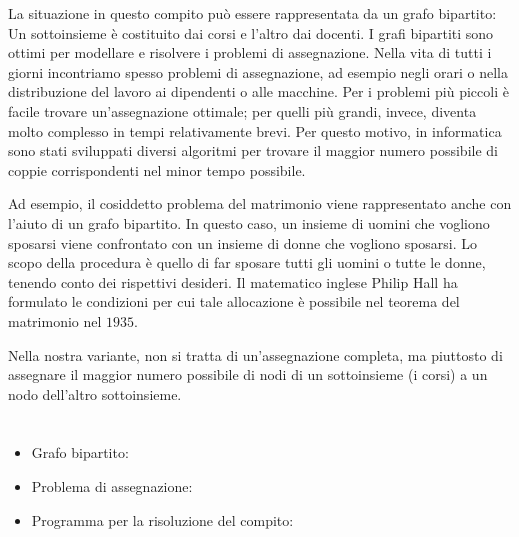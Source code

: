 {{{\centering%
\par}

La situazione in questo compito può essere rappresentata da un grafo bipartito: Un sottoinsieme è costituito dai corsi e l’altro dai docenti. I grafi bipartiti sono ottimi per modellare e risolvere i problemi di assegnazione. Nella vita di tutti i giorni incontriamo spesso problemi di assegnazione, ad esempio negli orari o nella distribuzione del lavoro ai dipendenti o alle macchine. Per i problemi più piccoli è facile trovare un’assegnazione ottimale; per quelli più grandi, invece, diventa molto complesso in tempi relativamente brevi. Per questo motivo, in informatica sono stati sviluppati diversi algoritmi per trovare il maggior numero possibile di coppie corrispondenti nel minor tempo possibile.

Ad esempio, il cosiddetto problema del matrimonio viene rappresentato anche con l’aiuto di un grafo bipartito. In questo caso, un insieme di uomini che vogliono sposarsi viene confrontato con un insieme di donne che vogliono sposarsi. Lo scopo della procedura è quello di far sposare tutti gli uomini o tutte le donne, tenendo conto dei rispettivi desideri. Il matematico inglese Philip Hall ha formulato le condizioni per cui tale allocazione è possibile nel teorema del matrimonio nel $1935$.

Nella nostra variante, non si tratta di un’assegnazione completa, ma piuttosto di assegnare il maggior numero possibile di nodi di un sottoinsieme (i corsi) a un nodo dell’altro sottoinsieme.



\section*{\BrochureWebsitesAndKeywords}
{\raggedright
\begin{itemize}
  \item Grafo bipartito: \href{https://it.wikipedia.org/wiki/Grafo_bipartito}{}
  \item Problema di assegnazione: \href{https://it.wikipedia.org/wiki/Problema_di_assegnazione}{}
  \item Programma per la risoluzione del compito: \href{https://www.coding4you.at/dachu_2023/ir02/index.html}{}
\end{itemize}


}}}
